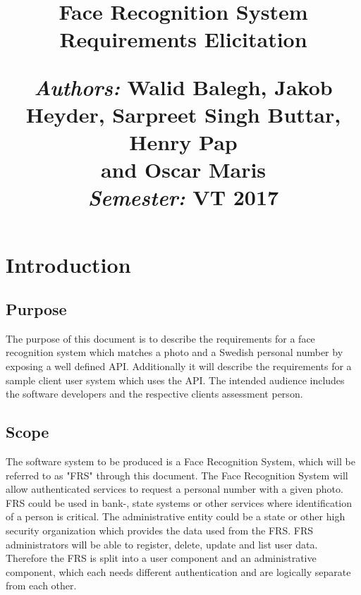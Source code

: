 \documentclass[a4paper,11pt]{article}
\title{
\vspace{-8cm}
\begin{flushleft}
    \vspace{10cm}
    \normalfont \normalsize
    \vspace{-1.3cm}
\end{flushleft}
\vspace{3cm}
\begin{flushleft}
    \huge Face Recognition System \\
    \LARGE  Requirements Elicitation\\
\end{flushleft}
\null
\vfill
\begin{minipage}{\textwidth}
\begin{flushleft} \large
\emph{Authors:} Walid Balegh, Jakob Heyder, Sarpreet Singh Buttar, Henry Pap\\ \hspace{45pt} and Oscar Maris \\ %
\emph{Semester:} VT 2017\\ %
\end{flushleft}
\end{minipage}
}
\date{}
\begin{document}
\maketitle

\newpage

\tableofcontents

\newpage





\newpage

\section{Introduction}

\subsection{Purpose}
The purpose of this document is to describe the requirements for a face recognition system which matches a photo and a Swedish personal number by exposing a well defined API. Additionally it will describe the requirements for a sample client user system which uses the API.
\newline
\noindent
The intended audience includes the software developers and the respective clients assessment person.

\subsection{Scope}

The software system to be produced is a Face Recognition System, which will be referred  to as "FRS" through this document.
\newline
\noindent
The Face Recognition System will allow authenticated services to request a personal number with a given photo.
FRS could be used in bank-, state systems or other services where identification of a person is critical.
The administrative entity could be a state or other high security organization which provides the data used from the FRS. \label{HighSecurityOrganisation}
FRS administrators will be able to register, delete, update and list user data.
Therefore the FRS is split into a user component and an administrative component, which each needs different authentication and are logically separate from each other.
\end{document}
